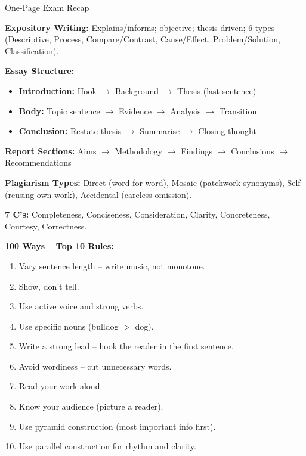 \documentclass[12pt,a4paper]{article}
\begin{document}
\begin{keybox}{One-Page Exam Recap}

\textbf{Expository Writing:} Explains/informs; objective; thesis-driven; 6 types (Descriptive, Process, Compare/Contrast, Cause/Effect, Problem/Solution, Classification).

\vspace{0.2cm}
\textbf{Essay Structure:}
\begin{itemize}[noitemsep]
    \item \textbf{Introduction:} Hook $\rightarrow$ Background $\rightarrow$ Thesis (last sentence)
    \item \textbf{Body:} Topic sentence $\rightarrow$ Evidence $\rightarrow$ Analysis $\rightarrow$ Transition
    \item \textbf{Conclusion:} Restate thesis $\rightarrow$ Summarise $\rightarrow$ Closing thought
\end{itemize}

\vspace{0.2cm}
\textbf{Report Sections:} Aims $\rightarrow$ Methodology $\rightarrow$ Findings $\rightarrow$ Conclusions $\rightarrow$ Recommendations

\vspace{0.2cm}
\textbf{Plagiarism Types:} Direct (word-for-word), Mosaic (patchwork synonyms), Self (reusing own work), Accidental (careless omission).

\vspace{0.2cm}
\textbf{7 C's:} \textcolor{primary}{C}ompleteness, \textcolor{primary}{C}onciseness, \textcolor{primary}{C}onsideration, \textcolor{primary}{C}larity, \textcolor{primary}{C}oncreteness, \textcolor{primary}{C}ourtesy, \textcolor{primary}{C}orrectness.

\vspace{0.2cm}
\textbf{100 Ways -- Top 10 Rules:}
\begin{enumerate}[noitemsep]
    \item Vary sentence length -- write music, not monotone.
    \item Show, don't tell.
    \item Use active voice and strong verbs.
    \item Use specific nouns (bulldog $>$ dog).
    \item Write a strong lead -- hook the reader in the first sentence.
    \item Avoid wordiness -- cut unnecessary words.
    \item Read your work aloud.
    \item Know your audience (picture a reader).
    \item Use pyramid construction (most important info first).
    \item Use parallel construction for rhythm and clarity.
\end{enumerate}


\end{keybox}
\end{document}
